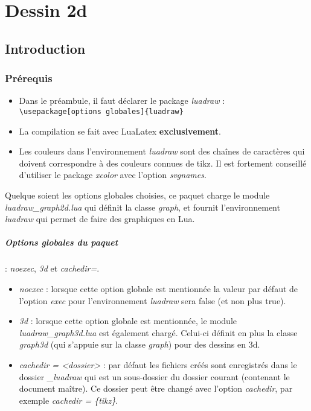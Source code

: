 \chapter{Dessin 2d}

\begin{center}
%
\par
{}
\end{center}

\section{Introduction}


\subsection{Prérequis}

\begin{itemize}
\item Dans le préambule, il faut déclarer le package \emph{luadraw} : \verb|\usepackage[options globales]{luadraw}|
\item La compilation se fait avec LuaLatex \textbf{exclusivement}.
\item Les couleurs dans l'environnement \emph{luadraw} sont des chaînes de caractères qui doivent correspondre à des couleurs connues de tikz. Il est fortement conseillé d'utiliser le package \emph{xcolor} avec l'option \emph{svgnames}.
\end{itemize}

Quelque soient les options globales choisies, ce paquet charge le module \emph{luadraw\_graph2d.lua} qui définit la classe \emph{graph}, et fournit l'environnement \emph{luadraw} qui permet de faire des graphiques en Lua.

\paragraph{Options globales du paquet} : \emph{noexec}, \emph{3d} et \emph{cachedir=}.

\begin{itemize}
    \item \emph{noexec} : lorsque cette option globale est mentionnée la valeur par défaut de l'option \emph{exec} pour l'environnement \emph{luadraw} sera false (et non plus true).
    \item \emph{3d} : lorsque cette option globale est mentionnée, le module \emph{luadraw\_graph3d.lua} est également chargé. Celui-ci définit en plus la classe \emph{graph3d} (qui s'appuie sur la classe \emph{graph}) pour des dessins en 3d. 
    \item \emph{cachedir = <dossier>} : par défaut les fichiers créés sont enregistrés dans le dossier \emph{\_luadraw} qui est un sous-dossier du dossier courant (contenant le document maître). Ce dossier peut être changé avec l'option \emph{cachedir}, par exemple \emph{cachedir = \{tikz\}}.
\end{itemize}

